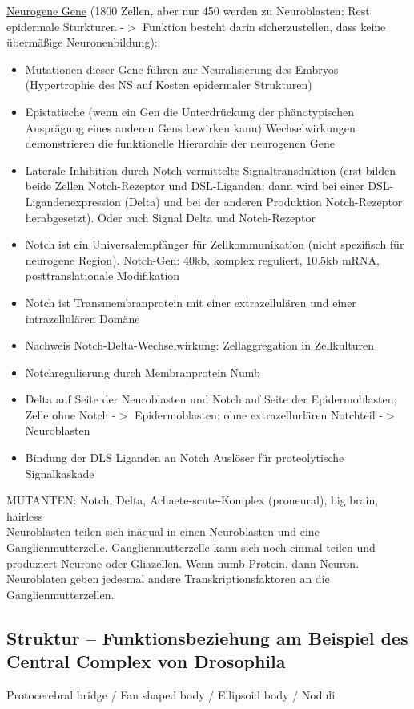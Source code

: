 \underline{Neurogene Gene} (1800 Zellen, aber nur 450 werden zu Neuroblasten; Rest epidermale Sturkturen -$>$ Funktion besteht darin sicherzustellen, dass keine übermäßige Neuronenbildung):
\begin{itemize}
	\item Mutationen dieser Gene führen zur Neuralisierung des Embryos (Hypertrophie des NS auf Kosten epidermaler Strukturen)
	\item Epistatische (wenn ein Gen die Unterdrückung der phänotypischen Ausprägung eines anderen Gens bewirken kann) Wechselwirkungen demonstrieren die funktionelle Hierarchie der neurogenen Gene
	\item Laterale Inhibition durch Notch-vermittelte Signaltransduktion (erst bilden beide Zellen Notch-Rezeptor und DSL-Liganden; dann wird bei einer DSL-Ligandenexpression (Delta) und bei der anderen Produktion Notch-Rezeptor herabgesetzt). Oder auch Signal Delta und Notch-Rezeptor
	\item Notch ist ein Universalempfänger für Zellkommunikation (nicht spezifisch für neurogene Region). Notch-Gen: 40kb, komplex reguliert, 10.5kb mRNA, posttranslationale Modifikation
	\item Notch ist Transmembranprotein mit einer extrazellulären und einer intrazellulären Domäne
	\item Nachweis Notch-Delta-Wechselwirkung: Zellaggregation in Zellkulturen
	\item Notchregulierung durch Membranprotein Numb
	\item Delta auf Seite der Neuroblasten und Notch auf Seite der Epidermoblasten; Zelle ohne Notch -$>$ Epidermoblasten; ohne extrazellurlären Notchteil -$>$ Neuroblasten
	\item Bindung der DLS Liganden an Notch Auslöser für proteolytische Signalkaskade
\end{itemize}

MUTANTEN: Notch, Delta, Achaete-scute-Komplex (proneural), big brain, hairless\\

Neuroblasten teilen sich inäqual in einen Neuroblasten und eine Ganglienmutterzelle. Ganglienmutterzelle kann sich noch einmal teilen und produziert Neurone oder Gliazellen. Wenn numb-Protein, dann Neuron. Neuroblaten geben jedesmal andere Transkriptionsfaktoren an die Ganglienmutterzellen.

\subsection{Struktur – Funktionsbeziehung am Beispiel des Central Complex von Drosophila}
Protocerebral bridge / Fan shaped body / Ellipsoid body / Noduli

